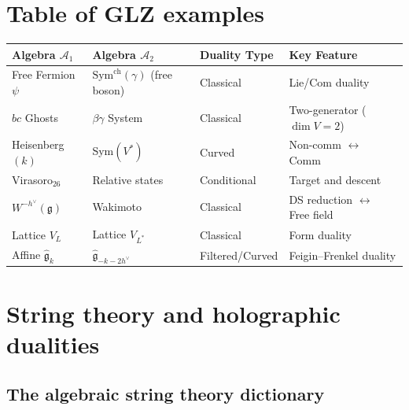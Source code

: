  
\section{Table of GLZ examples}
 
\begin{center}
\begin{tabular}{|l|l|l|l|}
\hline
Algebra $\mathcal{A}_1$ & Algebra $\mathcal{A}_2$ & Duality Type & Key Feature \\
\hline
Free Fermion $\psi$ & $\mathrm{Sym}^{\mathrm{ch}}(\gamma)$ (free boson) & Classical & Lie/Com duality \\
$bc$ Ghosts & $\beta\gamma$ System & Classical & Two-generator ($\dim V = 2$) \\
Heisenberg$(k)$ & Sym$(V^*)$ & Curved & Non-comm $\leftrightarrow$ Comm \\
Virasoro$_{26}$ & Relative states & Conditional & Target and descent \\
$W^{-h^\vee}(\mathfrak{g})$ & Wakimoto & Classical & DS reduction $\leftrightarrow$ Free field \\
Lattice $V_L$ & Lattice $V_{L^*}$ & Classical & Form duality \\
Affine $\hat{\mathfrak{g}}_k$ & $\hat{\mathfrak{g}}_{-k-2h^\vee}$ & Filtered/Curved & Feigin--Frenkel duality \\
\hline
\end{tabular}
\end{center}
 

\section{String theory and holographic dualities}

\subsection{The algebraic string theory dictionary}

